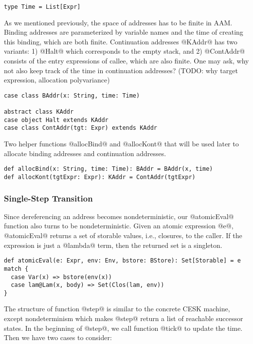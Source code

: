 \documentclass[acmsmall,review,anonymous]{acmart}\settopmatter{printfolios=true,printccs=false,printacmref=false}
\begin{document}
\begin{lstlisting}
type Time = List[Expr]
\end{lstlisting}

As we mentioned previously, the space of addresses has to be finite in AAM.
Binding addresses are parameterized by variable names and the time of creating this binding,
which are both finite.
Continuation addresses @KAddr@ has two variants:
1) @Halt@ which corresponds to the empty stack, and
2) @ContAddr@ consists of the entry expressions of callee, which are also
finite.
One may ask, why not also keep track of the time in continuation addresses?
(TODO: why target expression, allocation polyvariance)

\begin{lstlisting}
case class BAddr(x: String, time: Time)

abstract class KAddr
case object Halt extends KAddr
case class ContAddr(tgt: Expr) extends KAddr
\end{lstlisting}

Two helper functions @allocBind@ and @allocKont@ that will be used later
to allocate binding addresses and continuation addresses.

\begin{lstlisting}
def allocBind(x: String, time: Time): BAddr = BAddr(x, time)
def allocKont(tgtExpr: Expr): KAddr = ContAddr(tgtExpr)
\end{lstlisting}

\subsubsection{Single-Step Transition}

Since dereferencing an address becomes nondeterministic, our @atomicEval@
function also turns to be nondeterministic. Given an atomic expression @e@,
@atomicEval@ returns a set of storable values, i.e., closures, to the caller.
If the expression is just a @lambda@ term, then the returned set is a singleton.

\begin{lstlisting}
def atomicEval(e: Expr, env: Env, bstore: BStore): Set[Storable] = e match {
  case Var(x) => bstore(env(x))
  case lam@Lam(x, body) => Set(Clos(lam, env))
}
\end{lstlisting}

The structure of function @step@ is similar to the concrete CESK machine,
except nondeterminism which makes @step@ return a list of reachable successor states.
In the beginning of @step@, we call function @tick@ to update the time.
Then we have two cases to consider:
\end{document}
